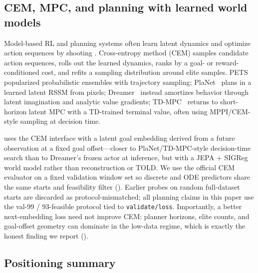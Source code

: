 \subsection{CEM, MPC, and planning with learned world models}
\label{sec:rel-cem}

Model-based RL and planning systems often learn latent dynamics and
optimize action sequences by shooting
\cite{chua2018pets,hafner2019planet}.
Cross-entropy method (CEM) samples candidate action sequences, rolls
out the learned dynamics, ranks by a goal- or reward-conditioned cost,
and refits a sampling distribution around elite samples.
PETS~\cite{chua2018pets} popularized probabilistic ensembles with
trajectory sampling; PlaNet~\cite{hafner2019planet} plans in a learned
latent RSSM from pixels; Dreamer~\cite{hafner2020dreamer} instead
amortizes behavior through latent imagination and analytic value
gradients; TD-MPC~\cite{hansen2022tdmpc} returns to short-horizon
latent MPC with a TD-trained terminal value, often using MPPI/CEM-style
sampling at decision time.

\LeWM{} uses the CEM interface with a latent goal embedding derived
from a future observation at a fixed goal offset---closer to
PlaNet/TD-MPC-style decision-time search than to Dreamer's frozen
actor at inference, but with a JEPA + SIGReg world model rather than
reconstruction or TOLD.
We use the official \LeWM{} CEM evaluator on a fixed validation window
set so discrete and ODE predictors share the same starts and
feasibility filter ().
Earlier probes on random full-dataset starts are discarded as
protocol-mismatched; all planning claims in this paper use the
val-99 / 93-feasible protocol tied to \texttt{validate/loss}.
Importantly, a better next-embedding loss need not improve CEM:
planner horizons, elite counts, and goal-offset geometry can dominate
in the low-data regime, which is exactly the honest finding we report
().

\subsection{Positioning summary}
\label{sec:rel-position}


